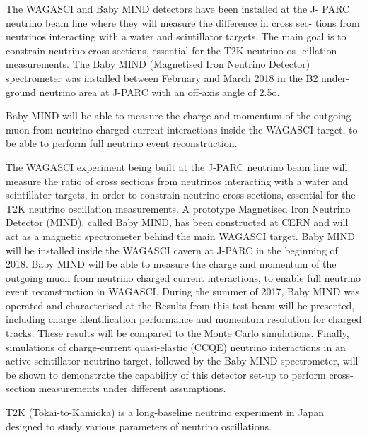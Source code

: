 The WAGASCI and Baby MIND detectors have been installed at the J- PARC neutrino beam line where they will measure the difference in cross sec- tions from neutrinos interacting with a water and scintillator targets. 
The main goal is to constrain neutrino cross sections, essential for the T2K neutrino os- cillation measurements. 
The Baby MIND (Magnetised Iron Neutrino Detector) spectrometer was installed between February and March 2018 in the B2 under- ground neutrino area at J-PARC with an off-axis angle of 2.5o. 


Baby MIND will be able to measure the charge and momentum of the outgoing muon from neutrino charged current interactions inside the WAGASCI target, to be able to perform full neutrino event reconstruction.


The WAGASCI experiment being built at the J-PARC neutrino beam line will measure the ratio of cross sections from neutrinos interacting with a water and scintillator targets, in order to constrain neutrino cross sections, essential for the T2K neutrino oscillation measurements. 
A prototype Magnetised Iron Neutrino Detector (MIND), called Baby MIND, has been constructed at CERN and will act as a magnetic spectrometer behind the main WAGASCI target. 
Baby MIND will be installed inside the WAGASCI cavern at J-PARC in the beginning of 2018. Baby MIND will be able to measure the charge and momentum of the outgoing muon from neutrino charged current interactions, to enable full neutrino event reconstruction in WAGASCI.
During the summer of 2017, Baby MIND was operated and characterised at the 
Results from this test beam will be presented, including charge identification performance and momentum resolution for charged tracks. These results will be compared to the Monte Carlo simulations. 
Finally, simulations of charge-current quasi-elastic (CCQE) neutrino interactions in an active scintillator neutrino target, followed by the Baby MIND spectrometer, will be shown to demonstrate the capability of this detector set-up to perform cross-section measurements under different assumptions.


T2K (Tokai-to-Kamioka) is a long-baseline neutrino experiment in Japan designed to study various parameters of neutrino oscillations. 

